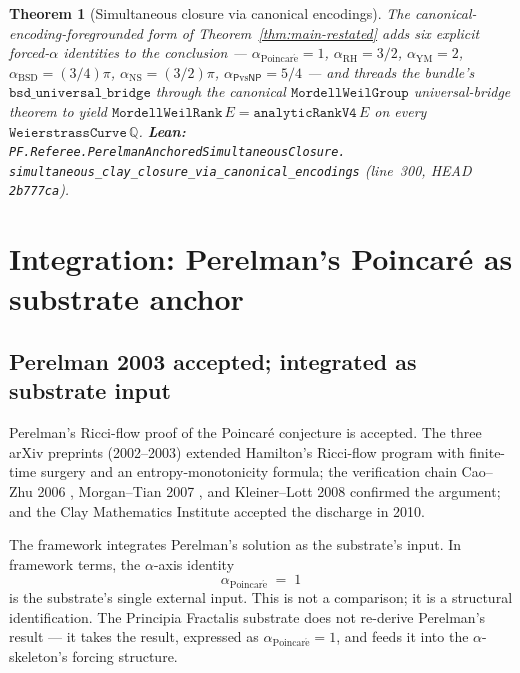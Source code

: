 \documentclass[11pt,a4paper]{article}
\theoremstyle{plain}
\newtheorem{theorem}{Theorem}[section]
\theoremstyle{definition}
\begin{document}
\begin{theorem}[Simultaneous closure via canonical encodings]
\label{thm:canonical-variant}
The canonical-encoding-foregrounded form of
Theorem~\ref{thm:main-restated} adds six explicit forced-$\alpha$
identities to the conclusion ---
$\alpha_{\mathrm{Poincar\acute e}} = 1$,
$\alpha_{\mathrm{RH}} = 3/2$,
$\alpha_{\mathrm{YM}} = 2$,
$\alpha_{\mathrm{BSD}} = (3/4)\pi$,
$\alpha_{\mathrm{NS}} = (3/2)\pi$,
$\alpha_{\mathsf{P}\mathrm{vs}\mathsf{NP}} = 5/4$ --- and
threads the bundle's $\mathtt{bsd\_universal\_bridge}$ through the
canonical $\mathtt{MordellWeilGroup}$ universal-bridge theorem to
yield $\mathtt{MordellWeilRank}\, E = \mathtt{analyticRankV4}\, E$
on every $\mathtt{WeierstrassCurve}\, \mathbb{Q}$.
\textbf{Lean:}
\texttt{PF.Referee.PerelmanAnchoredSimultaneousClosure.\\
simultaneous\_clay\_closure\_via\_canonical\_encodings}
(line~300, HEAD \texttt{2b777ca}).
\end{theorem}

\section{Integration: Perelman's Poincar\'e as substrate anchor}
\label{sec:integration}

\subsection{Perelman 2003 accepted; integrated as substrate input}
\label{sec:perelman-integrate}

Perelman's Ricci-flow proof of the Poincar\'e conjecture is
accepted. The three arXiv preprints
\cite{perelman2002,perelman2003a,perelman2003b} (2002--2003)
extended Hamilton's Ricci-flow program \cite{hamilton1982} with
finite-time surgery and an entropy-monotonicity formula; the
verification chain Cao--Zhu 2006 \cite{caozhu2006}, Morgan--Tian
2007 \cite{morgantian2007}, and Kleiner--Lott 2008
\cite{kleinerlott2008} confirmed the argument; and the Clay
Mathematics Institute accepted the discharge in 2010.

The framework integrates Perelman's solution as the substrate's
input. In framework terms, the $\alpha$-axis identity
\[
  \alpha_{\mathrm{Poincar\acute e}} \;=\; 1
\]
is the substrate's single external input. This is not a
comparison; it is a structural identification. The Principia
Fractalis substrate does not re-derive Perelman's result --- it
takes the result, expressed as
$\alpha_{\mathrm{Poincar\acute e}} = 1$, and feeds it into the
$\alpha$-skeleton's forcing structure.
\end{document}
